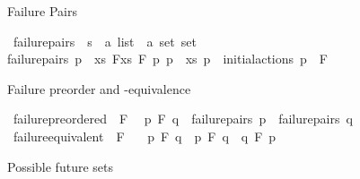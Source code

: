 \begin{isabellebody}
{\isafoldproof}%
%
\isadelimproof
%
\endisadelimproof
%
\begin{isamarkuptext}%
Failure Pairs%
\end{isamarkuptext}\isamarkuptrue%
\isamarkupfalse%
\ failure{\isacharunderscore}{\kern0pt}pairs\ {\isacharcolon}{\kern0pt}{\isacharcolon}{\kern0pt}\ {\isacartoucheopen}{\isacharprime}{\kern0pt}s\ {\isasymRightarrow}\ {\isacharparenleft}{\kern0pt}{\isacharprime}{\kern0pt}a\ list\ {\isasymtimes}\ {\isacharprime}{\kern0pt}a\ set{\isacharparenright}{\kern0pt}\ set{\isacartoucheclose}\isanewline
\ \ \isanewline
{\isacartoucheopen}failure{\isacharunderscore}{\kern0pt}pairs\ p\ {\isasymequiv}\ {\isacharbraceleft}{\kern0pt}{\isacharparenleft}{\kern0pt}xs{\isacharcomma}{\kern0pt}\ F{\isacharparenright}{\kern0pt}{\isacharbar}{\kern0pt}xs\ F{\isachardot}{\kern0pt}\ {\isasymexists}p{\isacharprime}{\kern0pt}{\isachardot}{\kern0pt}\ p\ {\isasymmapsto}{\isachardollar}{\kern0pt}\ xs\ p{\isacharprime}{\kern0pt}\ {\isasymand}\ {\isacharparenleft}{\kern0pt}initial{\isacharunderscore}{\kern0pt}actions\ p{\isacharprime}{\kern0pt}\ {\isasyminter}\ F\ {\isacharequal}{\kern0pt}\ {\isacharbraceleft}{\kern0pt}{\isacharbraceright}{\kern0pt}{\isacharparenright}{\kern0pt}{\isacharbraceright}{\kern0pt}{\isacartoucheclose}%
\begin{isamarkuptext}%
Failure preorder and -equivalence%
\end{isamarkuptext}\isamarkuptrue%
\isamarkupfalse%
\ failure{\isacharunderscore}{\kern0pt}preordered\ {\isacharparenleft}{\kern0pt}\ {\isacartoucheopen}{\isasymlesssim}F{\isacartoucheclose}\ {}{}{\isacharparenright}{\kern0pt}\ \isanewline
{\isacartoucheopen}p\ {\isasymlesssim}F\ q\ {\isasymequiv}\ failure{\isacharunderscore}{\kern0pt}pairs\ p\ {\isasymsubseteq}\ failure{\isacharunderscore}{\kern0pt}pairs\ q{\isacartoucheclose}\isanewline
\isanewline
{}\isamarkupfalse%
\ failure{\isacharunderscore}{\kern0pt}equivalent\ {\isacharparenleft}{\kern0pt}\ {\isacartoucheopen}{\isasymsimeq}F{\isacartoucheclose}\ {}{}{\isacharparenright}{\kern0pt}\ \isanewline
{\isacartoucheopen}\ p\ {\isasymsimeq}F\ q\ {\isasymequiv}\ p\ {\isasymlesssim}F\ q\ {\isasymand}\ q\ {\isasymlesssim}F\ p{\isacartoucheclose}%
\begin{isamarkuptext}%
Possible future sets%
\end{isamarkuptext}\isamarkuptrue%
\isamarkupfalse%

\end{isabellebody}
